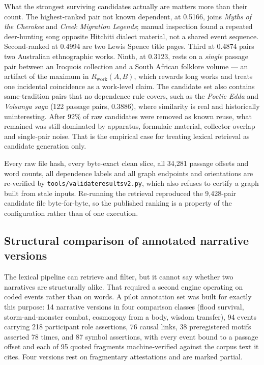 \documentclass[11pt]{article}
\DeclareRobustCommand{\_}{\textunderscore\allowbreak}
\begin{document}
What the strongest surviving candidates actually are matters more than their
count. The highest-ranked pair not known dependent, at 0.5166, joins
\emph{Myths of the Cherokee} and \emph{Creek Migration Legends}; manual inspection
found a repeated deer-hunting song opposite Hitchiti dialect material, not a
shared event sequence. Second-ranked at 0.4994 are two Lewis Spence title pages.
Third at 0.4874 pairs two Australian ethnographic works. Ninth, at 0.3123, rests
on a \emph{single} passage pair between an Iroquois collection and a South
African folklore volume --- an artifact of the maximum in
\(R_{\mathrm{work}}(A,B)\), which rewards long works and treats one incidental
coincidence as a work-level claim. The candidate set also contains same-tradition
pairs that no dependence rule covers, such as the \emph{Poetic Edda} and
\emph{Volsunga saga} (122 passage pairs, 0.3886), where similarity is real and
historically uninteresting. After 92\% of raw candidates were removed as known
reuse, what remained was still dominated by apparatus, formulaic material,
collector overlap and single-pair noise. That is the empirical case for treating
lexical retrieval as candidate generation only.

Every raw file hash, every byte-exact clean slice, all 34{,}281 passage offsets
and word counts, all dependence labels and all graph endpoints and orientations
are re-verified by \texttt{tools/validate\_results\_v2.py}, which also refuses to
certify a graph built from stale inputs. Re-running the retrieval reproduced the
9{,}428-pair candidate file byte-for-byte, so the published ranking is a property
of the configuration rather than of one execution.

\subsection{Structural comparison of annotated narrative versions}
\label{sec:structural}

The lexical pipeline can retrieve and filter, but it cannot say whether two
narratives are structurally alike. That required a second engine operating on
coded events rather than on words. A pilot annotation set was built for exactly
this purpose: 14 narrative versions in four comparison classes (flood survival,
storm-and-monster combat, cosmogony from a body, wisdom transfer), 94 events
carrying 218 participant role assertions, 76 causal links, 38 preregistered
motifs asserted 78 times, and 87 symbol assertions, with every event bound to a
passage offset and each of 95 quoted fragments machine-verified against the
corpus text it cites. Four versions rest on fragmentary attestations and are
marked partial.
\end{document}
